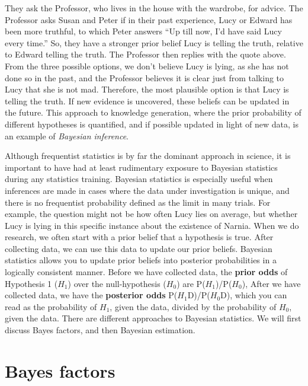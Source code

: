 \documentclass[
  oneside]{krantz}
\begin{document}
They ask the Professor, who lives in the house with the wardrobe, for advice. The Professor asks Susan and Peter if in their past experience, Lucy or Edward has been more truthful, to which Peter answers ``Up till now, I'd have said Lucy every time.'' So, they have a stronger prior belief Lucy is telling the truth, relative to Edward telling the truth. The Professor then replies with the quote above. From the three possible options, we don't believe Lucy is lying, as she has not done so in the past, and the Professor believes it is clear just from talking to Lucy that she is not mad. Therefore, the most plausible option is that Lucy is telling the truth. If new evidence is uncovered, these beliefs can be updated in the future. This approach to knowledge generation, where the prior probability of different hypotheses is quantified, and if possible updated in light of new data, is an example of \emph{Bayesian inference}.

Although frequentist statistics is by far the dominant approach in science, it is important to have had at least rudimentary exposure to Bayesian statistics during any statistics training. Bayesian statistics is especially useful when inferences are made in cases where the data under investigation is unique, and there is no frequentist probability defined as the limit in many trials. For example, the question might not be how often Lucy lies on average, but whether Lucy is lying in this specific instance about the existence of Narnia. When we do research, we often start with a prior belief that a hypothesis is true. After collecting data, we can use this data to update our prior beliefs. Bayesian statistics allows you to update prior beliefs into posterior probabilities in a logically consistent manner. Before we have collected data, the \textbf{prior odds} of Hypothesis 1 (\(H_1\)) over the null-hypothesis (\(H_0\)) are P(\(H_1\))/P(\(H_0\)), After we have collected data, we have the \textbf{posterior odds} P(\(H_1\)\textbar D)/P(\(H_0\)\textbar D), which you can read as the probability of \(H_1\), given the data, divided by the probability of \(H_0\), given the data. There are different approaches to Bayesian statistics. We will first discuss Bayes factors, and then Bayesian estimation.

\hypertarget{bayes-factors}{%
\section{Bayes factors}\label{bayes-factors}}
\end{document}
